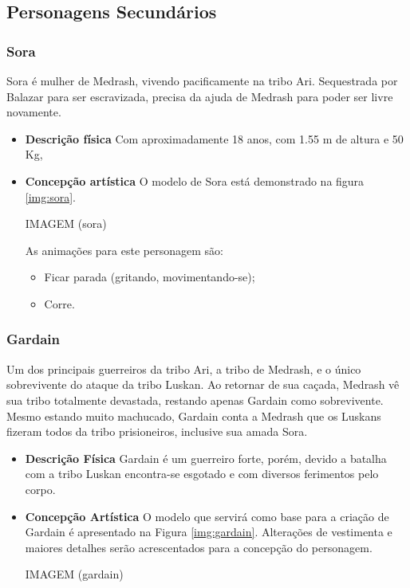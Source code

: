 \subsection{Personagens Secundários}
\subsubsection{Sora}
Sora é mulher de Medrash, vivendo pacificamente na tribo Ari. Sequestrada
 por Balazar para ser escravizada, precisa da ajuda de Medrash para poder
 ser livre novamente.
\begin{itemize}
\item {\bf Descrição física}
Com aproximadamente 18 anos, com 1.55 m de altura e 50 Kg, 
\item {\bf Concepção artística}
O modelo de Sora está demonstrado na figura \ref{img:sora}.

IMAGEM (sora)

As animações para este personagem são:
\begin{itemize}
\item Ficar parada (gritando, movimentando-se);
\item Corre.
\end{itemize}
\end{itemize}

\subsubsection{Gardain}
Um dos principais guerreiros da tribo Ari, a tribo de Medrash, e o único
 sobrevivente do ataque da tribo Luskan. Ao retornar de sua caçada, Medrash
 vê sua tribo totalmente devastada, restando apenas Gardain como
 sobrevivente. Mesmo estando muito machucado, Gardain conta a Medrash que
 os Luskans fizeram todos da tribo prisioneiros, inclusive sua amada Sora. 
\begin{itemize}
\item {\bf Descrição Física}
Gardain é um guerreiro forte, porém, devido a batalha com a tribo Luskan
 encontra-se esgotado e com diversos ferimentos pelo corpo.
\item {\bf Concepção Artística}
O modelo que servirá como base para a criação de Gardain é apresentado na
 Figura \ref{img:gardain}. Alterações de vestimenta e maiores detalhes
 serão acrescentados para a concepção do personagem.

IMAGEM (gardain)

\end{itemize}
